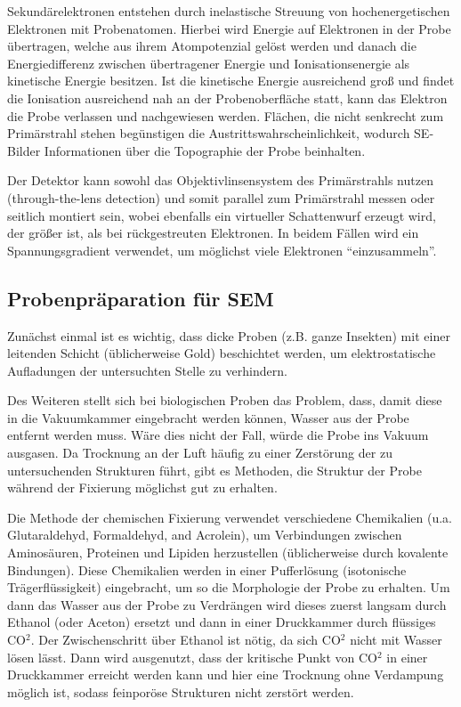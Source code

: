 Sekundärelektronen entstehen durch inelastische Streuung von hochenergetischen Elektronen mit Probenatomen.
Hierbei wird Energie auf Elektronen in der Probe übertragen, welche aus ihrem Atompotenzial gelöst werden und danach die Energiedifferenz zwischen übertragener Energie und Ionisationsenergie als kinetische Energie besitzen.
Ist die kinetische Energie ausreichend groß und findet die Ionisation ausreichend nah an der Probenoberfläche statt, kann das Elektron die Probe verlassen und nachgewiesen werden. %
Flächen, die nicht senkrecht zum Primärstrahl stehen begünstigen die Austrittswahrscheinlichkeit, wodurch SE-Bilder Informationen über die Topographie der Probe beinhalten.

Der Detektor kann sowohl das Objektivlinsensystem des Primärstrahls nutzen (through-the-lens detection) und somit parallel zum Primärstrahl messen oder seitlich montiert sein, wobei ebenfalls ein virtueller Schattenwurf erzeugt wird, der größer ist, als bei rückgestreuten Elektronen.
In beidem Fällen wird ein Spannungsgradient verwendet, um möglichst viele Elektronen \enquote{einzusammeln}.

\subsection{Probenpräparation für SEM}

Zunächst einmal ist es wichtig, dass dicke Proben (z.B. ganze Insekten) mit einer leitenden Schicht (üblicherweise Gold) beschichtet werden, um elektrostatische Aufladungen der untersuchten Stelle zu verhindern.

Des Weiteren stellt sich bei biologischen Proben das Problem, dass, damit diese in die Vakuumkammer eingebracht werden können, Wasser aus der Probe entfernt werden muss.
Wäre dies nicht der Fall, würde die Probe ins Vakuum ausgasen.
Da Trocknung an der Luft häufig zu einer Zerstörung der zu untersuchenden Strukturen führt, gibt es Methoden, die Struktur der Probe während der Fixierung möglichst gut zu erhalten.

Die Methode der chemischen Fixierung verwendet verschiedene Chemikalien (u.a. Glutaraldehyd, Formaldehyd, and Acrolein), um Verbindungen zwischen Aminosäuren, Proteinen und Lipiden herzustellen (üblicherweise durch kovalente Bindungen). \cite{bitesize}
Diese Chemikalien werden in einer Pufferlösung (isotonische Trägerflüssigkeit) eingebracht, um so die Morphologie der Probe zu erhalten.
Um dann das Wasser aus der Probe zu Verdrängen wird dieses zuerst langsam durch Ethanol (oder Aceton) ersetzt und dann in einer Druckkammer durch flüssiges CO$^2$.
Der Zwischenschritt über Ethanol ist nötig, da sich CO$^2$ nicht mit Wasser lösen lässt.
Dann wird ausgenutzt, dass der kritische Punkt von CO$^2$ in einer Druckkammer erreicht werden kann und hier eine Trocknung ohne Verdampung möglich ist, sodass feinporöse Strukturen nicht zerstört werden.

